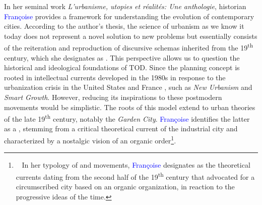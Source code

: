\begin{refsegment}
In her seminal work \textsl{L’urbanisme, utopies et réalités: Une anthologie}, historian \textcolor{blue}{Françoise} \textcolor{blue}{\textcite{choay_urbanisme_1965}} provides a framework for understanding the evolution of contemporary cities. According to the author's thesis, the science of urbanism as we know it today does not represent a novel solution to new problems but essentially consists of the reiteration and reproduction of discursive schemas inherited from the 19\textsuperscript{th} century, which she designates as . This perspective allows us to question the historical and ideological foundations of \acrshort{TOD}. Since the planning concept is rooted in intellectual currents developed in the 1980s in response to the urbanization crisis in the United States and France \textcolor{blue}{\autocite[11]{lefebvre_droit_1967}}, such as \textsl{New Urbanism} and \textsl{Smart Growth}. However, reducing its inspirations to these postmodern movements would be simplistic. The roots of this model extend to urban theories of the late 19\textsuperscript{th} century, notably the \textsl{Garden City}. \textcolor{blue}{Françoise} \textcolor{blue}{\textcite[259]{choay_urbanisme_1965}} identifies the latter as a , stemming from a critical theoretical current of the industrial city and characterized by a nostalgic vision of an organic order\footnote{~
    In her typology of  and  movements, \textcolor{blue}{Françoise} \textcolor{blue}{\textcite[277]{choay_urbanisme_1965}} designates as  the theoretical currents dating from the second half of the 19\textsuperscript{th} century that advocated for a circumscribed city based on an organic organization, in reaction to the progressive ideas of the time.
}.%


\end{refsegment}
